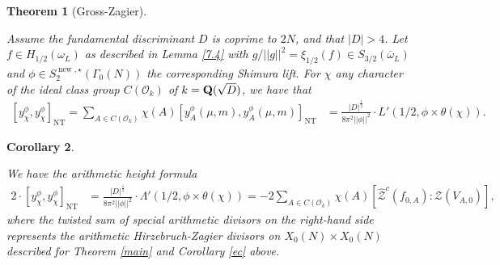 \documentclass{amsart}
\newtheorem{theorem}{Theorem}[section]
\newtheorem{corollary}[theorem]{Corollary}
\theoremstyle{definition}
\theoremstyle{definition}
\theoremstyle{definition}
\begin{document}
\begin{theorem}[Gross-Zagier]\label{GZF}

Assume the fundamental discriminant $D$ is coprime to $2N$, and that $\vert D \vert >4$.
Let $f \in H_{1/2}(\omega_L)$ as described in Lemma \ref{7.4} with $g/\vert \vert g \vert \vert^2 = \xi_{1/2}(f) \in S_{3/2}(\overline{\omega}_L)$ 
and $\phi \in S_2^{\operatorname{new}, \star}(\Gamma_0(N))$ the corresponding Shimura lift.
For $\chi$ any character of the ideal class group $C(\mathcal{O}_k)$ of $k={\bf{Q}}(\sqrt{D})$, we have that
\begin{align*} \left[ y_{\chi}^{\phi}, y_{\chi}^{\phi} \right]_{\operatorname{NT}}
= \sum\limits_{A \in C(\mathcal{O}_k)} \chi(A) \left[ y_A^{\phi}(\mu, m), y_A^{\phi}(\mu, m)\right]_{\operatorname{NT}}
&= \frac{ \vert D \vert^{\frac{1}{2}} }{ 8 \pi^2 \vert \vert \phi \vert \vert^2 } \cdot L'(1/2, \phi \times \theta(\chi)). \end{align*}
 \end{theorem}

\begin{corollary}\label{heightrelation} 

We have the arithmetic height formula
\begin{align*} 2  \cdot \left[ y_{\chi}^{\phi}, y_{\chi}^{\phi} \right]_{\operatorname{NT}}
&= \frac{\vert D \vert^{\frac{1}{2}}}{ 8 \pi^2 \vert \vert \phi \vert \vert^2 } \cdot \Lambda'(1/2, \phi \times \theta(\chi))
= -  2 \sum\limits_{A \in C(\mathcal{O}_k)} \chi(A) \left[ \widehat{\mathcal{Z}}^c(f_{0, A}) : \mathcal{Z}(V_{A,0}) \right],\end{align*}
where the twisted sum of special arithmetic divisors on the right-hand side represents the arithmetic Hirzebruch-Zagier 
divisors on $X_0(N) \times X_0(N)$ described for Theorem \ref{main} and Corollary \ref{ec} above. \end{corollary}
\end{document}
